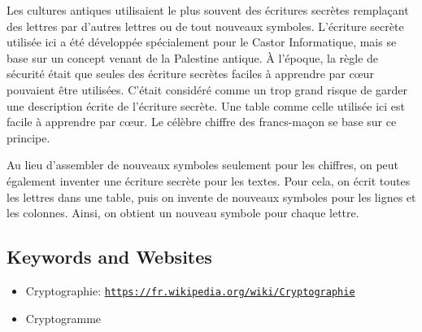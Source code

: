 \documentclass[a4paper,11pt]{report}
\newcommand{\BrochureUrlText}[1]{\texttt{#1}}
\begin{document}
Les cultures antiques utilisaient le plus souvent des écritures secrètes remplaçant des lettres par d’autres lettres ou de tout nouveaux symboles. L’écriture secrète utilisée ici a été développée spécialement pour le Castor Informatique, mais se base sur un concept venant de la Palestine antique. À l’époque, la règle de sécurité était que seules des écriture secrètes faciles à apprendre par cœur pouvaient être utilisées. C’était considéré comme un trop grand risque de garder une description écrite de l’écriture secrète. Une table comme celle utilisée ici est facile à apprendre par cœur. Le célèbre chiffre des francs-maçon se base sur ce principe.

Au lieu d’assembler de nouveaux symboles seulement pour les chiffres, on peut également inventer une écriture secrète pour les textes. Pour cela, on écrit toutes les lettres dans une table, puis on invente de nouveaux symboles pour les lignes et les colonnes. Ainsi, on obtient un nouveau symbole pour chaque lettre.

{\raggedright

\subsection*{Keywords and Websites}

\begin{itemize}
  \item Cryptographie: \href{https://fr.wikipedia.org/wiki/Cryptographie}{\BrochureUrlText{https://fr.wikipedia.org/wiki/Cryptographie}}
  \item Cryptogramme
\end{itemize}


}
\end{document}
